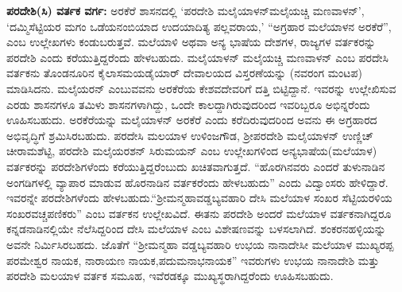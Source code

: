 \vskip 4pt

\textbf{ಪರದೇಶಿ(ಸಿ) ವರ್ತಕ ವರ್ಗ: } ಅರಕೆರೆ ಶಾಸನದಲ್ಲಿ ‘ಪರದೇಶಿ ಮಲೈಯಾಳನ್​ ಮಲೈಯಚ್ಚಿ ಮಣವಾಳನ್​’, ‘ದಮ್ಮಿಸೆಟ್ಟಿಯರ ಮಗಂ ಒಡೆಯನಂಬಿಯಾದ ಉದಯಾದಿತ್ಯ ಪಲ್ಲವರಾಯ,’ “ಅಗ್ರಹಾರ ಮಲೆಯಾಳನ ಅರಕೆರೆ”, ಎಂಬ ಉಲ್ಲೇಖಗಳು ಕಂಡುಬರುತ್ತವೆ. ಮಲೆಯಾಳಿ ಅಥವಾ ಅನ್ಯ ಭಾಷೆಯ ದೇಶಗಳ, ರಾಜ್ಯಗಳ ವರ್ತಕರನ್ನು ಪರದೇಶಿ ಎಂದು ಕರೆಯುತ್ತಿದ್ದರೆಂದು ಹೇಳಬಹುದು. ಮಲೈಯಾಳನ್​ ಮಲೈಯಚ್ಚಿ ಮಣವಾಳನ್​ ಎಂಬ ಪರದೇಸಿ ವರ್ತಕನು ತೊಂಡನೂರಿನ ಕೈಲಾಸಮಯಡೈಯಾರ್​ ದೇವಾಲಯದ ವಿಸ್ತರಣೆಯನ್ನು (ನವರಂಗ ಮಂಟಪ) ಮಾಡಿಸಿದನು. ಮಲೈಯರನ್​ ಎಂಬುವವನು ಅರಕೆರೆಯ ಕೇಶವದೇವರಿಗೆ ದತ್ತಿ ಬಿಟ್ಟಿದ್ದಾನೆ. ಇವರನ್ನು ಉಲ್ಲೇಖಿಸುವ ಎರಡು ಶಾಸನಗಳೂ ತಮಿಳು ಶಾಸನಗಳಾಗಿದ್ದು, ಒಂದೇ ಕಾಲದ್ದಾಗಿರುವುದರಿಂದ ಇವರಿಬ್ಬರೂ ಅಭಿನ್ನರೆಂದು ಊಹಿಸಬಹುದು. ಅರಕೆರೆಯನ್ನು ಮಲೈಯಾಳನ್​ ಅರಕೆರೆ ಎಂದು ಕರೆದಿರುವುದರಿಂದ ಅವನು ಈ ಅಗ್ರಹಾರದ ಅಭಿವೃದ್ಧಿಗೆ ಶ್ರಮಿಸಿರಬಹುದು. ಪರದೇಸಿ ಮಲಯಾಳ ಉಳಿಂಜಗೌಡ, ಶ‍್ರೀಪರದೇಶಿ ಮಲೈಯಾಳನ್​ ಉಣ್ಣಿಚ್​ ಚೀರಾಮಶೆಟ್ಟಿ, ಪರದೇಶಿ ಮಲೈಯರಶನ್​ ಸಿರುಮಯನ್​ ಎಂಬ ಉಲ್ಲೇಖಗಳಿಂದ ಅನ್ಯಭಾಷೆಯ(ಮಲೆಯಾಳ) ವರ್ತಕರನ್ನು ಪರದೇಶಿಗಳೆಂದು ಕರೆಯುತ್ತಿದ್ದ\-ರೆಂಬುದು ಖಚಿತವಾಗುತ್ತದೆ. “ಹೊರಗಿನವರು ಎಂದರೆ ತುಳುನಾಡಿನ ಅಂಗಡಿಗಳಲ್ಲಿ ವ್ಯಾಪಾರ ಮಾಡುವ ಹೊರನಾಡಿನ ವರ್ತಕರೆಂದು ಹೇಳಬಹುದು” ಎಂದು ವಿದ್ವಾಂಸರು ಹೇಳಿದ್ದಾರೆ. ಇವರನ್ನೇ ಪರದೇಶಿಗಳೆಂದು ಹೇಳಬಹುದು.\break “ಶ‍್ರೀಮನ್ಮಹಾವಡ್ಡಬ್ಯವಹಾರಿ ದೇಸಿ ಮಲೆಯಾಳ ಸಂಖರ ಸೆಟ್ಟಿಯರಳಿಯ ಸಂಖರವಚ್ಚಪಣಿಕರು” ಎಂಬ ವರ್ತಕನ ಉಲ್ಲೇಖವಿದೆ. ಈತನು ಪರದೇಶಿ ಅಂದರೆ ಮಲೆಯಾಳ ವರ್ತಕನಾಗಿದ್ದರೂ ಕನ್ನಡನಾಡಿನಲ್ಲಿಯೇ ನೆಲೆಸಿದ್ದರಿಂದ ದೇಸಿ ಮಲೆಯಾಳ ಎಂಬ ವಿಶೇಷಣವನ್ನು ಬಳಸಲಾಗಿದೆ. ಶಂಕರನಹಳ್ಳಿಯನ್ನು ಅವನೇ ನಿರ್ಮಿಸಿರಬಹದು. ಜೊತೆಗೆ “ಶ‍್ರೀಮನ್ಮಹಾ ವಡ್ಡಬ್ಯವಹಾರಿ ಉಭಯ ನಾನಾದೇಸೀ ಮಲೆಯಾಳ ಮುಖ್ಯರಪ್ಪ ಪರಮೇಶ್ವರ ನಾಯಕ, ನಾರಾಯಣ ನಾಯಕ,\break ಪದುಮನಾಭನಾಯಕ” ಇವರುಗಳು ಉಭಯ ನಾನಾದೇಶಿ ಮತ್ತು ಪರದೇಶಿ ಮಲಯಾಳ ವರ್ತಕ ಸಮೂಹ, ಇವೆರಡಕ್ಕೂ ಮುಖ್ಯಸ್ಥರಾಗಿದ್ದರೆಂದು ಊಹಿಸಬಹುದು.

\vskip 4pt

